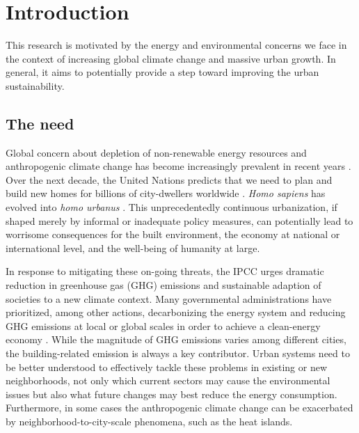 
\chapter{Introduction}

%

This research is motivated by the energy and environmental concerns we face in the context of increasing global climate change and massive urban growth. In general, it aims to potentially provide a step toward improving the urban sustainability.

\section{The need}

Global concern about depletion of non-renewable energy resources and anthropogenic climate change has become increasingly prevalent in recent years \cite{stocker2014climate}. Over the next decade, the United Nations predicts that we need to plan and build new homes for billions of city-dwellers worldwide \cite{united2015world}. \textit{Homo sapiens} has evolved into \textit{homo urbanus} \cite{grimond2007world}. This unprecedentedly continuous urbanization, if shaped merely by informal or inadequate policy measures, can potentially lead to worrisome consequences for the built environment, the economy at national or international level, and the well-being of humanity at large. 

In response to mitigating these on-going threats, the IPCC \cite{stocker2014climate} urges dramatic reduction in greenhouse gas (GHG) emissions and sustainable adaption of societies to a new climate context. Many governmental administrations have prioritized, among other actions, decarbonizing the energy system and reducing GHG emissions at local or global scales in order to achieve a clean-energy economy \cite{obama2017irreversible}. While the magnitude of GHG emissions varies among different cities, the building-related emission is always a key contributor. Urban systems need to be better understood to effectively tackle these problems in existing or new neighborhoods, not only which current sectors may cause the environmental issues but also what future changes may best reduce the energy consumption. Furthermore, in some cases the anthropogenic climate change can be exacerbated by neighborhood-to-city-scale phenomena, such as the heat islands.

